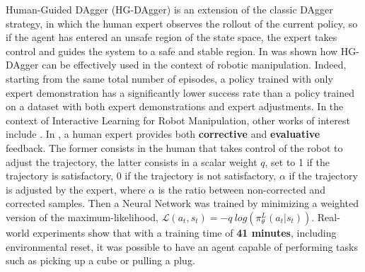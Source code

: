 \newline Human-Guided DAgger (HG-DAgger) \cite{kelly2019hg_dagger} is an extension of the classic DAgger strategy, in which the human expert observes the rollout of the current policy, so if the agent has entered an unsafe region of the state space, the expert takes control and guides the system to a safe and stable region. In \cite{jang2022bc_z} was shown how HG-DAgger can be effectively used in the context of robotic manipulation. Indeed, starting from the same total number of episodes, a policy trained with only expert demonstration has a significantly lower success rate than a policy trained on a dataset with both expert demonstrations and expert adjustments. In the context of Interactive Learning for Robot Manipulation, other works of interest include \cite{mandlekar2020human_in_the_loop,chisari2022correct}. In \cite{chisari2022correct}, a human expert provides both \textbf{corrective} and \textbf{evaluative} feedback. %
The former consists in the human that takes control of the robot to adjust the trajectory, the latter consists in a scalar weight $q$, set to 1 if the trajectory is satisfactory, 0 if the trajectory is not satisfactory, $\alpha$ if the trajectory is adjusted by the expert, where $\alpha$ is the ratio between non-corrected and corrected samples. Then a Neural Network %
was trained by minimizing a weighted version of the maximum-likelihood, $\mathcal{L}(a_{t},s_{t}) = - q \ log(\pi^{L}_{\theta}(a_{t}|s_{t}))$. Real-world experiments show that with a training time of \textbf{41 minutes}, including environmental reset, it was possible to have an agent capable of performing tasks such as picking up a cube or pulling a plug.
%

